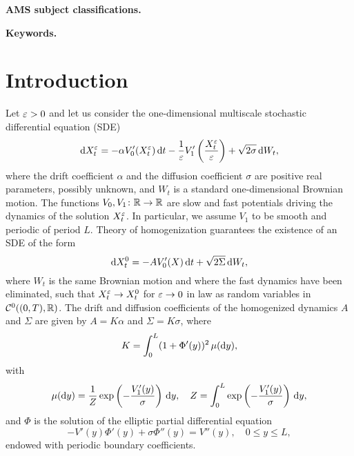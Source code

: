 \documentclass[10pt]{article}
\begin{document}
\maketitle	

\begin{abstract}
\end{abstract}

\textbf{AMS subject classifications.} 

\textbf{Keywords.} 

\section{Introduction}

Let $\varepsilon > 0$ and let us consider the one-dimensional multiscale stochastic differential equation (SDE)
\begin{equation}\label{eq:SDE_MS}
	\mathrm{d} X_t^\varepsilon = -\alpha V_0'(X_t^\varepsilon) \,\mathrm{d} t - \frac1{\varepsilon} V_1'\left(\frac{X_t^\varepsilon}{\varepsilon}\right) + \sqrt{2\sigma} \,\mathrm{d} W_t,
\end{equation}
where the drift coefficient $\alpha$ and the diffusion coefficient $\sigma$ are positive real parameters, possibly unknown, and $W_t$ is a standard one-dimensional Brownian motion. The functions $V_0, V_1\colon \mathbb{R} \to \mathbb{R}$ are slow and fast potentials driving the dynamics of the solution $X_t^\varepsilon$. In particular, we assume $V_1$ to be smooth and periodic of period $L$. Theory of homogenization \cite{BLP78} guarantees the existence of an SDE of the form
\begin{equation}\label{eq:SDE_HOM}
	\mathrm{d} X_t^0 = -A V_0'(X) \,\mathrm{d} t + \sqrt{2\Sigma} \,\mathrm{d} W_t,
\end{equation}
where $W_t$ is the same Brownian motion and where the fast dynamics have been eliminated, such that $X_t^\varepsilon \to X_t^0$ for $\varepsilon\to 0$ in law as random variables in $\mathcal C^0((0, T), \mathbb{R})$. The drift and diffusion coefficients of the homogenized dynamics $A$ and $\Sigma$ are given by $A = K\alpha$ and $\Sigma = K\sigma$, where
\begin{equation}\label{eq:K_HOM}
	K = \int_0^L (1 + \Phi'(y))^2 \, \mu(\mathrm{d} y),
\end{equation}
with 
\begin{equation}
	\mu(\mathrm{d} y) = \frac1Z \exp\left(-\frac{V_1'(y)}{\sigma}\right) \,\mathrm{d} y, \quad Z = \int_0^L \exp\left(-\frac{V_1'(y)}{\sigma}\right) \,\mathrm{d} y,
\end{equation}
and $\Phi$ is the solution of the elliptic partial differential equation
\begin{equation}
	-V'(y)\Phi'(y) + \sigma \Phi''(y) = V''(y), \quad 0 \leq y \leq L,
\end{equation}
endowed with periodic boundary coefficients.
\end{document}
